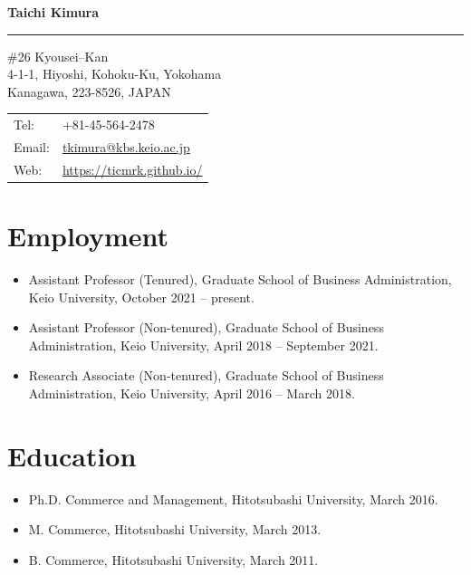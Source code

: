 \documentclass[letterpaper,11pt]{article}
\def\name{Taichi Kimura}
\begin{document}
{\headingfont\Huge\bfseries \name}

\vspace{0.4em}
{\color{rulegray}\rule{\linewidth}{0.4pt}}
\vspace{0.5em}

\begin{minipage}[t]{0.55\linewidth}
  \#26 Kyousei--Kan \\
  4-1-1, Hiyoshi, Kohoku-Ku, Yokohama \\
  Kanagawa, 223-8526, JAPAN
\end{minipage}%
\hfill
\begin{minipage}[t]{0.40\linewidth}
  \begin{tabular}{@{}ll@{}}
    Tel: & +81-45-564-2478 \\
    Email: & \href{mailto:tkimura@kbs.keio.ac.jp}{tkimura@kbs.keio.ac.jp}\\
    Web: & \url{https://ticmrk.github.io/}
  \end{tabular}
\end{minipage}

\section*{Employment}

\begin{itemize}
    \item Assistant Professor (Tenured), Graduate School of Business Administration, Keio University, October 2021 -- present.
    \item Assistant Professor (Non-tenured), Graduate School of Business Administration, Keio University, April 2018 -- September 2021.
    \item Research Associate (Non-tenured), Graduate School of Business Administration, Keio University, April 2016 -- March 2018.
\end{itemize}

\section*{Education}

\begin{itemize}
  \item Ph.D. Commerce and Management, Hitotsubashi University, March 2016.
  \item M. Commerce, Hitotsubashi University, March 2013.
  \item B. Commerce, Hitotsubashi University, March 2011.
\end{itemize}
\end{document}
